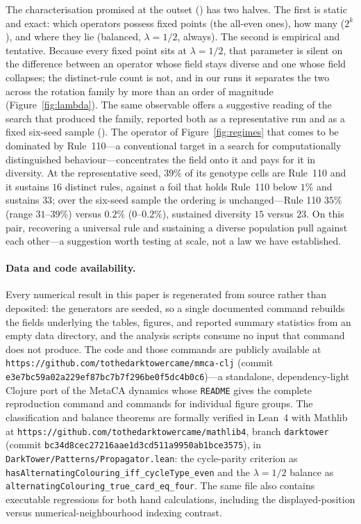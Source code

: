 \documentclass[man,12pt,floatsintext,donotrepeattitle]{apa7}
\newcommand{\secref}[1]{\emph{\nameref{#1}}}
\begin{document}
The characterisation promised at the outset (\secref{sec:object}) has two
halves. The
first is static and exact: which operators possess fixed points (the
all-even ones), how many ($2^k$), and where they lie (balanced,
$\lambda = 1/2$, always). The second is empirical and tentative. Because
every fixed point sits at $\lambda = 1/2$, that parameter is silent on the
difference between an operator whose field stays diverse and one whose field
collapses; the distinct-rule count is not, and in our
runs it separates the two across the rotation family by more than an order of
magnitude (Figure~\ref{fig:lambda}). The same observable offers a suggestive
reading of the search that produced the family, reported both as a
representative run and as a fixed six-seed sample (\secref{sec:limits}). The
operator of Figure~\ref{fig:regimes} that comes to be dominated by
Rule~110---a conventional target in a search for computationally distinguished
behaviour---concentrates the field onto it and pays for it in diversity.
At the representative seed, $39\%$ of its genotype cells are Rule~110 and it
sustains $16$ distinct rules, against a foil that holds Rule~110 below $1\%$
and sustains $33$; over the six-seed sample the ordering is unchanged---Rule
110 $35\%$ (range $31$--$39\%$) versus $0.2\%$ ($0$--$0.2\%$), sustained diversity
$15$ versus $23$. On this pair, recovering a universal rule and sustaining a
diverse population pull against each other---a suggestion worth testing at
scale, not a law we have established.

\paragraph{Data and code availability.} Every numerical result in this paper is
regenerated from source rather than deposited: the generators are seeded, so a
single documented command rebuilds the fields underlying the tables, figures,
and reported summary statistics from an empty data directory, and the analysis
scripts consume no input that command does not produce. The code and those
commands are publicly available at
\texttt{https://github.com/tothedarktowercame/mmca-clj} (commit
\texttt{e3e7bc59a02a229ef87bc7b7f296be0f5dc4b0c6})---a standalone,
dependency-light Clojure port of the MetaCA dynamics whose \texttt{README} gives
the complete reproduction command and commands for individual figure groups.
The classification and balance theorems are
formally verified in Lean~4 with Mathlib at
\texttt{https://github.com/tothedarktowercame/mathlib4}, branch \texttt{darktower}
(commit \texttt{bc34d8cec27216aae1d3cd511a9950ab1bce3575}), in
\texttt{DarkTower/Patterns/Propagator.lean}: the cycle-parity criterion as
\texttt{hasAlternatingColouring\_iff\_cycleType\_even} and the $\lambda = 1/2$
balance as \texttt{alternatingColouring\_true\_card\_eq\_four}. The same file
also contains executable regressions for both hand calculations, including the
displayed-position versus numerical-neighbourhood indexing contrast.
\end{document}
